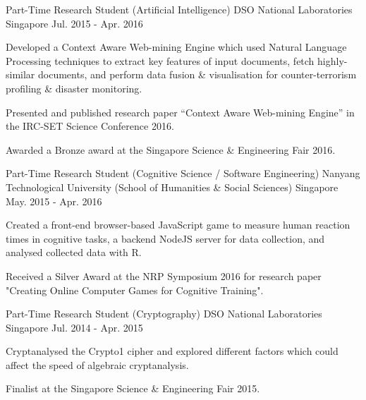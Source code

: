 \begin{cventries}
  \cventry
    {Part-Time Research Student (Artificial Intelligence)} %
    {DSO National Laboratories} %
    {Singapore} %
    {Jul. 2015 - Apr. 2016} %
    {
      \begin{cvitems} %
        \item {Developed a Context Aware Web-mining Engine which used Natural Language Processing techniques to extract key features of input documents, fetch highly-similar documents, and perform data fusion \& visualisation for counter-terrorism profiling \& disaster monitoring.}
        \item {Presented and published research paper “Context Aware Web-mining Engine” in the IRC-SET Science Conference 2016.}
        \item {Awarded a Bronze award at the Singapore Science \& Engineering Fair 2016.}
      \end{cvitems}
    }

  \cventry
    {Part-Time Research Student (Cognitive Science / Software Engineering)} %
    {Nanyang Technological University (School of Humanities \& Social Sciences)} %
    {Singapore} %
    {May. 2015 - Apr. 2016} %
    {
      \begin{cvitems} %
        \item {Created a front-end browser-based JavaScript game to measure human reaction times in cognitive tasks, a backend NodeJS server for data collection, and analysed collected data with R.}
        \item {Received a Silver Award at the NRP Symposium 2016 for research paper "Creating Online Computer Games for Cognitive Training".}
      \end{cvitems}
    }

  \cventry
    {Part-Time Research Student (Cryptography)} %
    {DSO National Laboratories} %
    {Singapore} %
    {Jul. 2014 - Apr. 2015} %
    {
      \begin{cvitems} %
        \item {Cryptanalysed the Crypto1 cipher and explored different factors which could affect the speed of algebraic cryptanalysis.}
        \item {Finalist at the Singapore Science \& Engineering Fair 2015.}
      \end{cvitems}
    }
\end{cventries}
